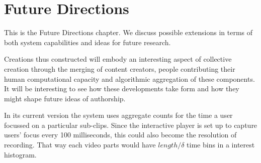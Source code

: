 \chapter{Future Directions}
\label{ch:future}

 

This is the Future Directions chapter. We discuss possible extensions in terms of both system capabilities and ideas for future research.

Creations thus constructed will embody an interesting aspect of collective creation through the merging of content creators, people contributing their human computational capacity and algorithmic aggregation of these components. It will be interesting to see how these developments take form and how they might shape future ideas of authorship.


In its current version the system uses aggregate counts for the time a user focussed on a particular sub-clips. Since the interactive player is set up to capture users' focus every 100 milliseconds, this could also become the resolution of recording. That way each video parts would have $length/\delta$ time bins in a interest histogram.

